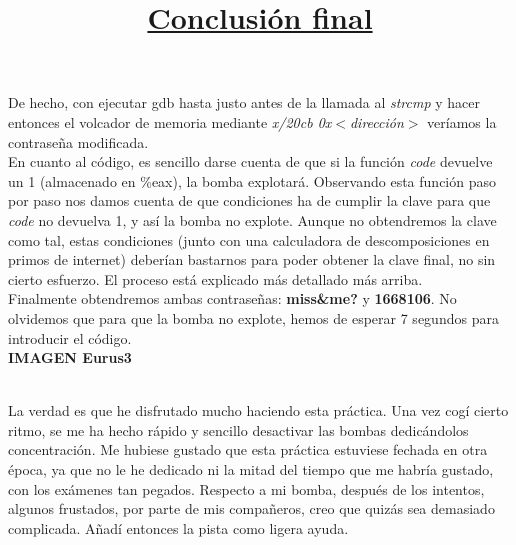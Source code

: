 \documentclass[11pt,a4paper]{article}
\begin{document}
De hecho, con ejecutar gdb hasta justo antes de la llamada al \emph{strcmp} y hacer entonces el volcador de memoria mediante \emph{x/20cb 0x$<$dirección$>$} veríamos la contraseña modificada. \\

En cuanto al código, es sencillo darse cuenta de que si la función \emph{code} devuelve un 1 (almacenado en \%eax), la bomba explotará. Observando esta función paso por paso nos damos cuenta de que condiciones ha de cumplir la clave para que \emph{code} no devuelva 1, y así la bomba no explote. Aunque no obtendremos la clave como tal, estas condiciones (junto con una calculadora de descomposiciones en primos de internet) deberían bastarnos para poder obtener la clave final, no sin cierto esfuerzo. El proceso está explicado más detallado más arriba. \\

Finalmente obtendremos ambas contraseñas: \textbf{miss\&me?} y \textbf{1668106}. No olvidemos que para que la bomba no explote, hemos de esperar 7 segundos para introducir el código. \\   

\textbf{IMAGEN Eurus3} \\

\title{\large{\textbf{\underline{Conclusión final}}}} \\

La verdad es que he disfrutado mucho haciendo esta práctica. Una vez cogí cierto ritmo, se me ha hecho rápido y sencillo desactivar las bombas dedicándolos concentración. Me hubiese gustado que esta práctica estuviese fechada en otra época, ya que no le he dedicado ni la mitad del tiempo que me habría gustado, con los exámenes tan pegados. Respecto a mi bomba, después de los intentos, algunos frustados, por parte de mis compañeros, creo que quizás sea demasiado complicada. Añadí entonces la pista como ligera ayuda. \\
\end{document}
